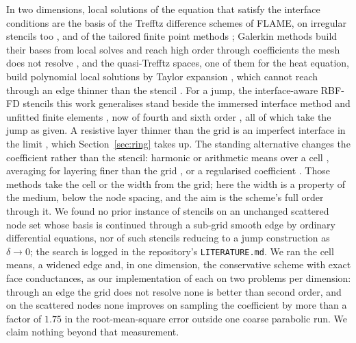 \documentclass[11pt]{amsart}
\theoremstyle{definition}
\theoremstyle{remark}
\begin{document}
In two dimensions, local solutions of the equation that satisfy the interface
conditions are the basis of the Trefftz difference schemes of FLAME, on
irregular stencils too \cite{Tsukerman2006,Tsukerman2010}, and of the
tailored finite point methods \cite{Huang2009,HanZhang2012}; Galerkin
methods build their bases from local solves
\cite{BabuskaCalozOsborn1994,HouWu1997,ChuGrahamHou2010,OwhadiZhang2007,MalqvistPeterseim2014}
and reach high order through coefficients the mesh does not resolve
\cite{Maier2021,HauckPeterseim2023}, and the quasi-Trefftz spaces, one of
them for the heat equation, build polynomial local solutions by Taylor
expansion
\cite{ImbertGerardMoiolaPerinatiStocker2025,GomezPerinatiStocker2026}, which
cannot reach through an edge thinner than the stencil
\cite{Martin2026seeds}. For a jump, the interface-aware RBF-FD stencils this
work generalises \cite{Martin2016,MartinFornberg2017heat} stand beside the
immersed interface method and unfitted finite elements
\cite{LeVequeLi1994,LiIto2006,HansboHansbo2002,BurmanEtAl2015}, now of
fourth and sixth order \cite{FengZhao2020,FengHanMinev2024}, all of which
take the jump as given. A resistive layer thinner than the grid is an
imperfect interface in the limit
\cite{SanchezPalencia1974,PerrusselPoignard2013,Hashin2001}, which
Section~\ref{sec:ring} takes up. The standing alternative changes the
coefficient rather than the stencil: harmonic or arithmetic means over a
cell \cite{Patankar1980,EwingIlievLazarov2001,GoodeAppel1992}, averaging for
layering finer than the grid
\cite{MoskowEtAl1999,DavydychevaDruskinHabashy2003}, or a regularised
coefficient \cite{TornbergEngquist2003,TornbergEngquist2006}. Those methods
take the cell or the width from the grid; here the width is a property of
the medium, below the node spacing, and the aim is the scheme's full order
through it. We found no prior instance of stencils on an unchanged scattered
node set whose basis is continued through a sub-grid smooth edge by ordinary
differential equations, nor of such stencils reducing to a jump construction
as $\delta \to 0$; the search is logged in the repository's
\texttt{LITERATURE.md}. We ran the cell means, a widened edge and, in one
dimension, the conservative scheme with exact face conductances, as our
implementation of each on two problems per dimension: through an edge the
grid does not resolve none is better than second order, and on the scattered
nodes none improves on sampling the coefficient by more than a factor of
$1.75$ in the root-mean-square error outside one coarse parabolic run. We
claim nothing beyond that measurement.
\end{document}
